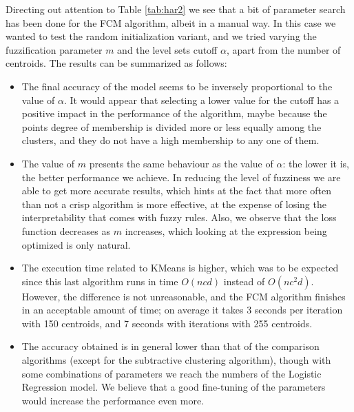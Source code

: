 Directing out attention to Table \ref{tab:har2} we see that a bit of parameter search has been done for the FCM algorithm, albeit in a manual way. In this case  we wanted to test the random initialization variant, and we tried varying the fuzzification parameter $m$ and the level sets cutoff $\alpha$, apart from the number of centroids. The results can be summarized as follows:

\begin{itemize}
  \item The final accuracy of the model seems to be inversely proportional to the value of $\alpha$. It would appear that selecting a lower value for the cutoff has a positive impact in the performance of the algorithm, maybe because the points degree of membership is divided more or less equally among the clusters, and they do not have a high membership to any one of them.
  \item The value of $m$ presents the same behaviour as the value of $\alpha$: the lower it is, the better performance we achieve. In reducing the level of fuzziness we are able to get more accurate results, which hints at the fact that more often than not a crisp algorithm is more effective, at the expense of losing the interpretability that comes with fuzzy rules. Also, we observe that the loss function decreases as $m$ increases, which looking at the expression being optimized is only natural.
  \item The execution time related to KMeans is higher, which was to be expected since this last algorithm runs in time $O(ncd)$ instead of $O(nc^2d)$. However, the difference is not unreasonable, and the FCM algorithm finishes in an acceptable amount of time; on average it takes 3 seconds per iteration with 150 centroids, and 7 seconds with iterations with 255 centroids.
  \item The accuracy obtained is in general lower than that of the comparison algorithms (except for the subtractive clustering algorithm), though with some combinations of parameters we reach the numbers of the Logistic Regression model. We believe that a good fine-tuning of the parameters would increase the performance even more.
\end{itemize}

